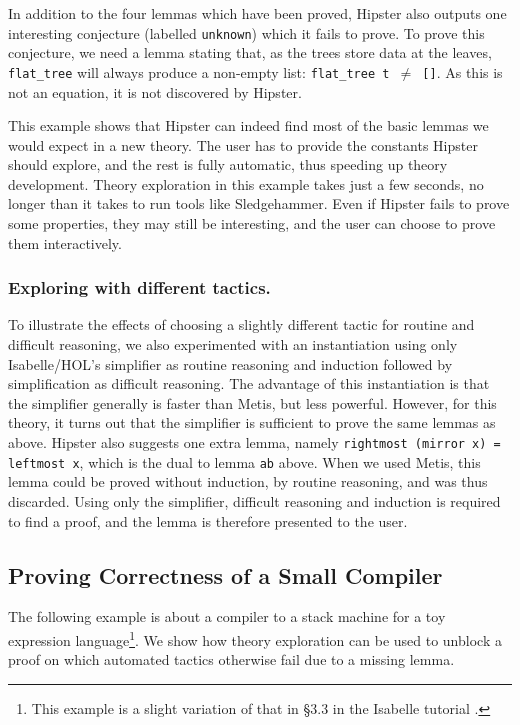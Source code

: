 In addition to the four lemmas which have been proved, Hipster also outputs one interesting conjecture (labelled \texttt{unknown}) which it fails to prove. To prove this conjecture, we need a lemma stating that, as the trees store data at the leaves, \texttt{flat\_tree} will always produce a non-empty list: 
 \texttt{flat\_tree t $\neq$ []}. As this is not an equation, it is not discovered by Hipster.
  
This example shows that Hipster can indeed find most of the basic lemmas we would expect in a new theory. The user has to provide the constants Hipster should explore, and the rest is fully automatic, thus speeding up theory development.  Theory exploration in this example takes just a few seconds, no longer than it takes to run tools like Sledgehammer. Even if Hipster fails to prove some properties, they may still be interesting, and the user can choose to prove them interactively.

\subsubsection*{Exploring with different tactics.}
To illustrate the effects of choosing a slightly different tactic for routine and difficult reasoning, we also experimented with an instantiation using only Isabelle/HOL's simplifier as routine reasoning and induction followed by simplification as difficult reasoning. The advantage of this instantiation is that the simplifier generally is faster than Metis, but less powerful. However, for this theory, it turns out that the simplifier is sufficient to prove the same lemmas as above. Hipster also suggests one extra lemma, namely \texttt{rightmost (mirror x) = leftmost x}, which is the dual to lemma \texttt{ab} above. When we used Metis, this lemma could be proved without induction, by routine reasoning, and was thus discarded. Using only the simplifier, difficult reasoning and induction is required to find a proof, and the lemma is therefore presented to the user. 

\subsection{Proving Correctness of a Small Compiler}
\label{sec:comp-ex}
The following example is about a compiler to a stack machine for a toy
expression language\footnote{This example is a slight variation of that in \S3.3 in the Isabelle tutorial \cite{isabelle}. }. We show how theory exploration can be used to unblock a proof on which automated tactics otherwise fail due to a missing lemma.

